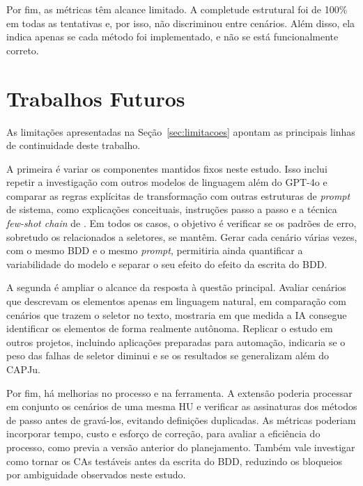 Por fim, as métricas têm alcance limitado. A completude estrutural foi de 100\% em todas as tentativas e, por isso, não discriminou entre cenários. Além disso, ela indica apenas se cada método foi implementado, e não se está funcionalmente correto.

\section{Trabalhos Futuros}
\label{sec:trabalhos-futuros}

As limitações apresentadas na Seção~\ref{sec:limitacoes} apontam as principais linhas de continuidade deste trabalho.

A primeira é variar os componentes mantidos fixos neste estudo. Isso inclui repetir a investigação com outros modelos de linguagem além do GPT-4o e comparar as regras explícitas de transformação com outras estruturas de \textit{prompt} de sistema, como explicações conceituais, instruções passo a passo e a técnica \textit{few-shot chain} de . Em todos os casos, o objetivo é verificar se os padrões de erro, sobretudo os relacionados a seletores, se mantêm. Gerar cada cenário várias vezes, com o mesmo BDD e o mesmo \textit{prompt}, permitiria ainda quantificar a variabilidade do modelo e separar o seu efeito do efeito da escrita do BDD.

A segunda é ampliar o alcance da resposta à questão principal. Avaliar cenários que descrevam os elementos apenas em linguagem natural, em comparação com cenários que trazem o seletor no texto, mostraria em que medida a IA consegue identificar os elementos de forma realmente autônoma. Replicar o estudo em outros projetos, incluindo aplicações preparadas para automação, indicaria se o peso das falhas de seletor diminui e se os resultados se generalizam além do CAPJu.

Por fim, há melhorias no processo e na ferramenta. A extensão poderia processar em conjunto os cenários de uma mesma HU e verificar as assinaturas dos métodos de passo antes de gravá-los, evitando definições duplicadas. As métricas poderiam incorporar tempo, custo e esforço de correção, para avaliar a eficiência do processo, como previa a versão anterior do planejamento. Também vale investigar como tornar os CAs testáveis antes da escrita do BDD, reduzindo os bloqueios por ambiguidade observados neste estudo.




